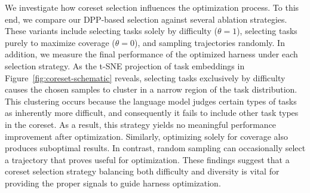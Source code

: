 \documentclass{llmxive}
\providecommand{\method}{\textsc{RHO}}
\begin{document}
\begin{table}[t]
\centering
\footnotesize
\setlength{\tabcolsep}{4pt}
\ifdim\wd0>\columnwidth
  \resizebox{\columnwidth}{!}{\usebox0}%
\else
  \usebox0%
\fi
\vspace{-1.5em}
\caption{Ablation of the diagnosis step across all three benchmarks. Each row re-renders full \method{}'s diagnoses with one cue blanked, holding the proposal agent's prompt fixed (\S\ref{sec:disc-diagnosis}). \emph{Raw trajectory} skips diagnosis and shows the proposal agent the raw trajectories directly. Cells report held-out pass rate.}
\label{tab:diagnosis}
\end{table}

 We investigate how coreset selection influences the optimization process.
To this end, we compare our DPP-based selection against several ablation strategies.
These variants include selecting tasks solely by difficulty ($\theta=1$), selecting tasks purely to maximize coverage ($\theta=0$), and sampling trajectories randomly.
In addition, we measure the final performance of the optimized harness under each selection strategy.
As the t-SNE projection of task embeddings in Figure~\ref{fig:coreset-schematic} reveals, selecting tasks exclusively by difficulty causes the chosen samples to cluster in a narrow region of the task distribution.
This clustering occurs because the language model judges certain types of tasks as inherently more difficult, and consequently it fails to include other task types in the coreset.
As a result, this strategy yields no meaningful performance improvement after optimization.
Similarly, optimizing solely for coverage also produces suboptimal results.
In contrast, random sampling can occasionally select a trajectory that proves useful for optimization.
These findings suggest that a coreset selection strategy balancing both difficulty and diversity is vital for providing the proper signals to guide harness optimization.
\end{document}

